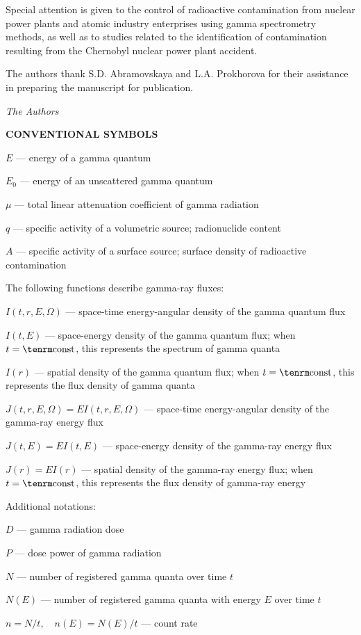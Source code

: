 Special attention is given to the control of radioactive contamination from nuclear power plants and atomic industry enterprises using gamma spectrometry methods, as well as to studies related to the identification of contamination resulting from the Chernobyl nuclear power plant accident.

The authors thank S.D. Abramovskaya and L.A. Prokhorova for their assistance in preparing the manuscript for publication.

\hfill{\it The Authors}
\vfill
\eject

{\bf CONVENTIONAL SYMBOLS}

$E$ --- energy of a gamma quantum

$E_0$ --- energy of an unscattered gamma quantum

$\mu$ --- total linear attenuation coefficient of gamma radiation

$q$ --- specific activity of a volumetric source; radionuclide content

$A$ --- specific activity of a surface source; surface density of radioactive contamination

 The following functions describe gamma-ray fluxes:

$I(t,r,E,\Omega)$ --- space-time energy-angular density of the gamma quantum flux

$I(t,E)$ --- space-energy density of the gamma quantum flux; when $t={\rm const}$, this represents the spectrum of gamma quanta

$I(r)$ --- spatial density of the gamma quantum flux; when $t={\rm const}$, this represents the flux density of gamma quanta

$J(t,r,E,\Omega)=EI(t,r,E,\Omega)$ --- space-time energy-angular density of the gamma-ray energy flux

$J(t,E)=EI(t,E)$ --- space-energy density of the gamma-ray energy flux

$J(r)=EI(r)$ --- spatial density of the gamma-ray energy flux; when $t={\rm const}$, this represents the flux density of gamma-ray energy

 Additional notations:

$D$ --- gamma radiation dose

$P$ --- dose power of gamma radiation

$N$ --- number of registered gamma quanta over time $t$

$N(E)$ --- number of registered gamma quanta with energy $E$ over time $t$

$n=N/t,\quad n(E)=N(E)/t$ --- count rate

